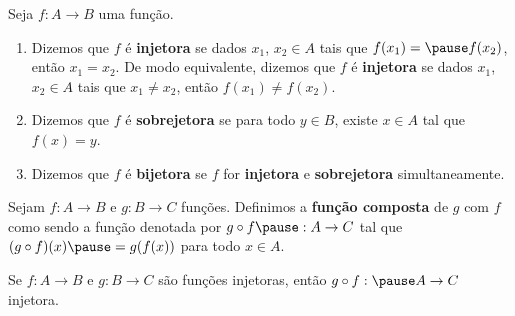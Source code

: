\documentclass{beamer}
\begin{document}
    \begin{frame}
        \begin{definicao}
            Seja $f : A \to B$ uma fun\c{c}\~ao.\pause
            \begin{enumerate}[label={\roman*})]
                \item Dizemos que $f$ \'e \textbf{injetora} \pause se dados $x_1$, \pause $x_2 \in A$ \pause tais que $f(x_1) = \pause f(x_2)$, \pause ent\~ao $x_1 = x_2$. \pause De modo equivalente, \pause dizemos que $f$ \'e \textbf{injetora} \pause se dados $x_1$, \pause $x_2 \in A$ \pause tais que $x_1 \ne x_2$, \pause ent\~ao $f(x_1) \ne f(x_2)$.\pause

                \vspace{.3cm}

                \item Dizemos que $f$ \'e \textbf{sobrejetora} \pause se para todo $y \in B$, \pause existe $x \in A$ \pause tal que $f(x) = y$.\pause

                \vspace{.3cm}

                \item Dizemos que $f$ é \textbf{bijetora} \pause se $f$ for \textbf{injetora} \pause e \textbf{sobrejetora} \pause simultaneamente.
            \end{enumerate}
        \end{definicao}
    \end{frame}
    \begin{frame}
        \vspace{1cm}
        \begin{definicao}
            Sejam $f : A \to B$ \pause e $g : B \to C$ \pause fun\c{c}\~oes. \pause Definimos a \textbf{fun\c{c}\~ao composta} \pause de $g$ com $f$ \pause como sendo a fun\c{c}\~ao denotada por $g \circ f \pause : A \to C$ \pause tal que \pause $(g\circ f)(x) \pause = g(f(x))$ \pause para todo $x \in A$.
        \end{definicao}
    \end{frame}

    \begin{frame}
        \begin{proposicao}
            Se $f : A \to B$ \pause e $g : B \to C$ \pause s{\~a}o fun{\c c}{\~o}es injetoras, \pause ent{\~a}o $g\circ f : \pause A \to C$  injetora.
        \end{proposicao}
    \end{frame}
\end{document}
